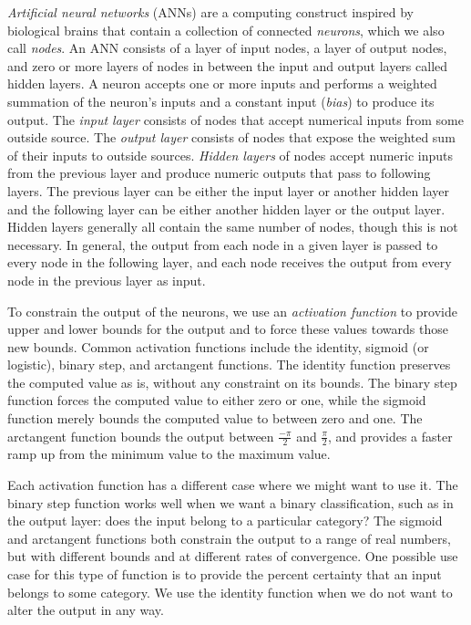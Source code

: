 \textit{Artificial neural networks} (ANNs) are a computing construct inspired by biological brains that contain a collection of connected \textit{neurons}, which we also call \textit{nodes}.
An ANN consists of a layer of input nodes, a layer of output nodes, and zero or more layers of nodes in between the input and output layers called hidden layers.
A neuron accepts one or more inputs and performs a weighted summation of the neuron's inputs and a constant input (\textit{bias}) to produce its output.
The \textit{input layer} consists of nodes that accept numerical inputs from some outside source.
The \textit{output layer} consists of nodes that expose the weighted sum of their inputs to outside sources.
\textit{Hidden layers} of nodes accept numeric inputs from the previous layer and produce numeric outputs that pass to following layers.
The previous layer can be either the input layer or another hidden layer and the following layer can be either another hidden layer or the output layer.
Hidden layers generally all contain the same number of nodes, though this is not necessary.
In general, the output from each node in a given layer is passed to every node in the following layer, and each node receives the output from every node in the previous layer as input.

To constrain the output of the neurons, we use an \textit{activation function} to provide upper and lower bounds for the output and to force these values towards those new bounds.
Common activation functions include the identity, sigmoid (or logistic), binary step, and arctangent functions.
The identity function preserves the computed value as is, without any constraint on its bounds.
The binary step function forces the computed value to either zero or one, while the sigmoid function merely bounds the computed value to between zero and one.
The arctangent function bounds the output between $\frac{-\pi}{2}$ and $\frac{\pi}{2}$, and provides a faster ramp up from the minimum value to the maximum value.

Each activation function has a different case where we might want to use it.
The binary step function works well when we want a binary classification, such as in the output layer: does the input belong to a particular category?
The sigmoid and arctangent functions both constrain the output to a range of real numbers, but with different bounds and at different rates of convergence.
One possible use case for this type of function is to provide the percent certainty that an input belongs to some category.
We use the identity function when we do not want to alter the output in any way.

